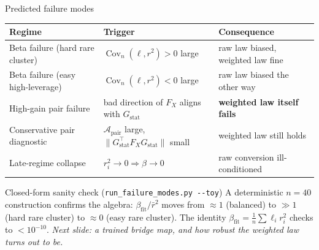 \documentclass[10pt,aspectratio=169]{beamer}
\newcommand{\hl}[1]{{\color{nicered}\textbf{#1}}}
\newcommand{\T}{^{\!\top}}
\DeclareMathOperator{\Cov}{Cov}
\begin{document}
\begin{frame}{Predicted failure modes}
  \footnotesize
  \centering
  \renewcommand{\arraystretch}{1.18}
  \begin{tabular}{@{}p{4.0cm}p{4.6cm}p{4.9cm}@{}}
    \toprule
    \textbf{Regime} & \textbf{Trigger} & \textbf{Consequence} \\
    \midrule
    Beta failure (hard rare cluster)   & $\Cov_n(\ell, r^2) > 0$ large & raw law biased, weighted law fine \\
    Beta failure (easy high-leverage)  & $\Cov_n(\ell, r^2) < 0$ large & raw law biased the other way \\
    High-gain pair failure             & bad direction of $F_X$ aligns with $G_{\mathrm{stat}}$ & \hl{weighted law itself fails} \\
    Conservative pair diagnostic       & $\mathcal{A}_{\mathrm{pair}}$ large, $\|G_\mathrm{stat}\T F_X G_\mathrm{stat}\|$ small & weighted law still holds \\
    Late-regime collapse               & $r_i^2 \to 0 \Rightarrow \beta \to 0$ & raw conversion ill-conditioned \\
    \bottomrule
  \end{tabular}
  \vspace{8pt}
  \begin{ibox}{Closed-form sanity check (\texttt{run\_failure\_modes.py -{}-toy})}
    A deterministic $n = 40$ construction confirms the algebra: $\beta_{\mathrm{fit}}/\bar r^2$ moves from $\approx 1$ (balanced) to $\gg 1$ (hard rare cluster) to $\approx 0$ (easy rare cluster). The identity $\beta_{\mathrm{fit}} = \tfrac{1}{n}\sum \ell_i r_i^2$ checks to $<10^{-10}$. \emph{Next slide: a trained bridge map, and how robust the weighted law turns out to be.}
  \end{ibox}
\end{frame}
\end{document}
